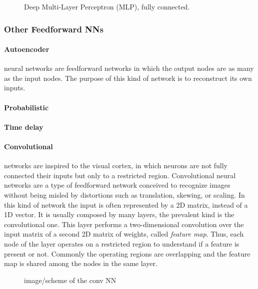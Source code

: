 \begin{figure}[ht]
	\centering
	
	\caption{	Deep Multi-Layer Perceptron (MLP), fully connected.}
	\label{fig:deepMLP}
\end{figure}

\subsubsection{Other Feedforward NNs}
\label{sssec:Other_Feedforward_NNs}

\paragraph{Autoencoder} neural networks are feedforward networks in which the output nodes are as many as the input nodes.
The purpose of this kind of network is to reconstruct its own inputs.

\paragraph{Probabilistic}

\paragraph{Time delay}

\paragraph{Convolutional}\label{par:Convolutional} networks are inspired to the visual cortex, in which neurons are not fully connected their inputs but only to a restricted region.
Convolutional neural networks are a type of feedforward network conceived to recognize images without being misled by distortions such as translation, skewing, or scaling.
In this kind of network the input is often represented by a 2D matrix, instead of a 1D vector.
It is usually composed by many layers, the prevalent kind is the convolutional one.
This layer performs a two-dimensional convolution over the input matrix of a second 2D matrix of weights, called \textit{feature map}.
Thus, each node of the layer operates on a restricted region to understand if a feature is present or not.
Commonly the operating regions are overlapping and the feature map is shared among the nodes in the same layer.

\begin{figure}[ht]
	\centering
	
	\caption{image/scheme of the conv NN}
	\label{fig:convolutionalNN}
\end{figure}


